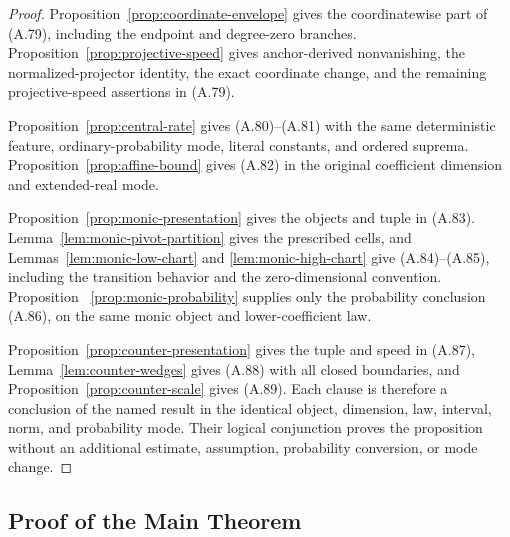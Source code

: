 \begin{proof}
Proposition~\ref{prop:coordinate-envelope} gives the coordinatewise part of
(A.79), including the endpoint and degree-zero branches.
Proposition~\ref{prop:projective-speed} gives anchor-derived nonvanishing,
the normalized-projector identity, the exact coordinate change, and the
remaining projective-speed assertions in (A.79).

Proposition~\ref{prop:central-rate} gives (A.80)--(A.81) with the same
deterministic feature, ordinary-probability mode, literal constants, and
ordered suprema.  Proposition~\ref{prop:affine-bound} gives (A.82) in the
original coefficient dimension and extended-real mode.

Proposition~\ref{prop:monic-presentation} gives the objects and tuple in
(A.83).  Lemma~\ref{lem:monic-pivot-partition} gives the prescribed cells,
and Lemmas~\ref{lem:monic-low-chart} and
\ref{lem:monic-high-chart} give (A.84)--(A.85), including the transition
behavior and the zero-dimensional convention.  Proposition
~\ref{prop:monic-probability} supplies only the probability conclusion
(A.86), on the same monic object and lower-coefficient law.

Proposition~\ref{prop:counter-presentation} gives the tuple and speed in
(A.87), Lemma~\ref{lem:counter-wedges} gives (A.88) with all closed
boundaries, and Proposition~\ref{prop:counter-scale} gives (A.89).  Each
clause is therefore a conclusion of the named result in the identical
object, dimension, law, interval, norm, and probability mode.  Their logical
conjunction proves the proposition without an additional estimate,
assumption, probability conversion, or mode change.
\end{proof}

\subsection{Proof of the Main Theorem}

